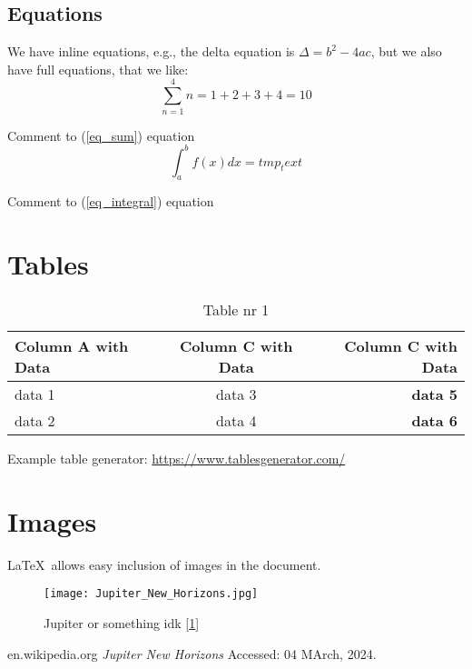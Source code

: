\documentclass{article}
\begin{document}
\subsection{Equations}
We have inline equations, e.g., the delta equation is $\Delta=b^2-4ac$, but we also have full equations, that we like:
\begin{equation}
    \label{eq_sum}
    \sum_{n=1}^{4} n = 1 + 2 + 3 + 4 = 10 
\end{equation}

Comment to (\ref{eq_sum}) equation
\begin{equation}
    \int_{a}^b f(x)dx = tmp_text
    \label{eq_integral}
\end{equation}

Comment to (\ref{eq_integral}) equation

\section{Tables}

\begin{table}[H]
    \centering
    \begin{tabular}{|l|c|r|}
    \hline
    Column A with Data & Column C with Data & \textbf{Column C with Data} \\ \hline
    data 1             & data 3             & \textbf{data 5}             \\ \hline
    data 2             & data 4             & \textbf{data 6}             \\ \hline
    \end{tabular}
    \caption{Table nr 1}
\end{table}
Example table generator: \url{https://www.tablesgenerator.com/}

\section{Images}
\LaTeX\ allows easy inclusion of images in the document.

\begin{figure}[htbp]
    \centering
    \texttt{[image: Jupiter\_New\_Horizons.jpg]}
    \caption{Jupiter or something idk [\ref{jupiter}]}
    \label{jupiter}
\end{figure}

\begin{thebibliography}{9}
    en.wikipedia.org  \emph{Jupiter New Horizons}
    Accessed: 04 MArch, 2024.
\end{thebibliography}
\end{document}
